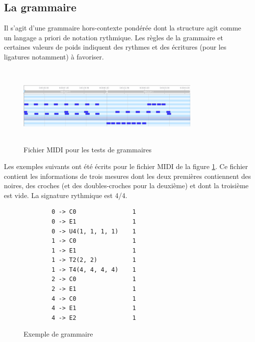 \subsection*{La grammaire}
\label{gram}
Il s’agit d’une grammaire hors-contexte pondérée dont la structure agit comme
un langage a priori de notation rythmique. Les règles de la grammaire et
certaines valeurs de poids indiquent des rythmes et des écritures (pour les
ligatures notamment) à favoriser.\\

\begin{figure}[h]
    \centering
    \includegraphics[height=40mm, width=90mm]{
    z_images/4_experimentations/3_developpement/0_midi_2bars_fill.png}
    \caption{Fichier MIDI pour les tests de grammaires}
    \label{midi_gram}
\end{figure}

Les exemples suivants ont été écrits pour le fichier MIDI de la figure
\ref{midi_gram}. Ce fichier contient les informations de trois mesures dont les
deux premières contiennent des noires, des croches (et des doubles-croches pour
la deuxième) et dont la troisième est vide. La signature rythmique est
4/4.  

\begin{figure}[h]
    \centering
    \begin{verbatim}
        0 -> C0                1
        0 -> E1                1
        0 -> U4(1, 1, 1, 1)    1
        1 -> C0                1
        1 -> E1                1
        1 -> T2(2, 2)          1
        1 -> T4(4, 4, 4, 4)    1
        2 -> C0                1
        2 -> E1                1
        4 -> C0                1
        4 -> E1                1
        4 -> E2                1
        \end{verbatim}
        \caption{Exemple de grammaire}
        \label{ex_gram}
\end{figure}

